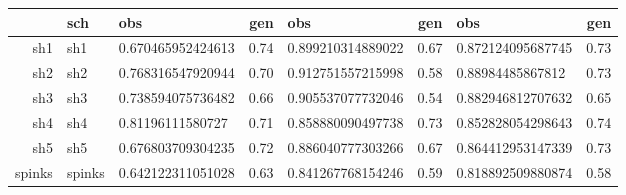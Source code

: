 \begin{table}[ht]
\centering
\begin{tabular}{rllrlrlr}
  \hline
 & sch & obs & gen & obs & gen & obs & gen \\ 
  \hline
sh1 & sh1 & 0.670465952424613 & 0.74 & 0.899210314889022 & 0.67 & 0.872124095687745 & 0.73 \\ 
  sh2 & sh2 & 0.768316547920944 & 0.70 & 0.912751557215998 & 0.58 & 0.88984485867812 & 0.73 \\ 
  sh3 & sh3 & 0.738594075736482 & 0.66 & 0.905537077732046 & 0.54 & 0.882946812707632 & 0.65 \\ 
  sh4 & sh4 & 0.81196111580727 & 0.71 & 0.858880090497738 & 0.73 & 0.852828054298643 & 0.74 \\ 
  sh5 & sh5 & 0.676803709304235 & 0.72 & 0.886040777303266 & 0.67 & 0.864412953147339 & 0.73 \\ 
  spinks & spinks & 0.642122311051028 & 0.63 & 0.841267768154246 & 0.59 & 0.818892509880874 & 0.58 \\ 
   \hline
\end{tabular}
\label{comp_tab}
\end{table}
